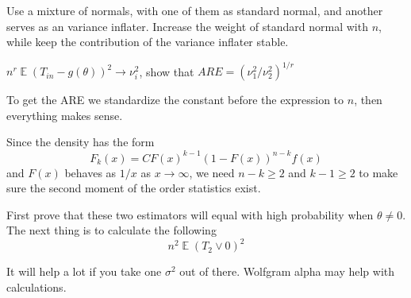 \documentclass[12pt]{article}
\newcommand{\1}{\mathbbm{1}}
\newenvironment{exercise}[2][Exercise]{\begin{trivlist}
\item[\hskip \labelsep {\bfseries #1}\hskip \labelsep {\bfseries #2.}]}{\end{trivlist}}
\newcommand{\E}{\operatorname{\mathbb{E}}}
\begin{document}
Use a mixture of normals, with one of them as standard normal, and another serves as an variance inflater. Increase the weight of standard normal with $n$, while keep the contribution of the variance inflater stable.

\begin{exercise}{}
$n^r \E (T_{in} - g(\theta))^2 \rightarrow \nu_i^2$, show that $ARE = (\nu_1^2 / \nu_2^2)^{1/r}$
\end{exercise}

To get the ARE we standardize the constant before the expression to $n$, then everything makes sense.

\begin{exercise}{Cauchy order statistics}
\end{exercise}

Since the density has the form
$$
F_k(x) = C F(x)^{k-1} (1 - F(x))^{n-k} f(x)
$$
and $F(x)$ behaves as $1/x$ as $x \rightarrow \infty$, we need $n - k\geq 2$ and $k-1 \geq 2$ to make sure the second moment of the order statistics exist.

\begin{exercise}{ARE for $T_2$ and $T_2 \vee 0$ }
\end{exercise}

First prove that these two estimators will equal with high probability when $\theta \neq 0$. The next thing is to calculate the following
$$
n^2 \E (T_2 \vee 0)^2 
$$

It will help a lot if you take one $\sigma^2$ out of there. Wolfgram alpha may help with calculations.
\end{document}
